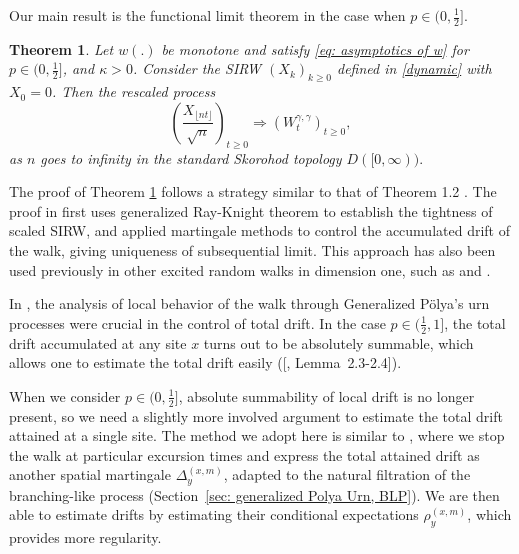 \documentclass[twoside,12pt,a4paper]{article}
\newtheorem{theorem}{Theorem}[section]
\numberwithin{equation}{section}
\begin{document}
	Our main result is the functional limit theorem in the case when $p\in (0,\frac{1}{2}]$.
	\begin{theorem}\label{thm: main}
		Let $w(.)$ be monotone and satisfy \eqref{eq: asymptotics of w} for $p\in (0,\frac{1}{2}]$, and $\kappa >0 $. Consider the SIRW $(X_k)_{k\geq 0}$ defined in \eqref{dynamic} with $X_0 =0$. Then the rescaled process
		$$
		\left(  \frac{X_{\lfloor nt \rfloor }}{\sqrt{n}}  \right)_{t\geq 0} \Longrightarrow \left( W^{\gamma,\gamma}_{t}\right)_{t\geq 0},
		$$ as $n$ goes to infinity in the standard Skorohod topology $D([0,\infty) ).$
	\end{theorem}
	The proof of Theorem \ref{thm: main} follows a strategy similar to that of Theorem 1.2 \cite{KMP22}. The proof in \cite{KMP22} first uses generalized Ray-Knight theorem to establish the tightness of scaled SIRW, and applied martingale methods to control the accumulated drift of the walk, giving uniqueness of subsequential limit. 
	This approach
	has also been used previously in other excited random walks in dimension one, such as \cite{DK12} and \cite{KP16}.

	In \cite{KMP22}, the analysis of local behavior of the walk through Generalized P\"olya's urn processes were crucial in the control of total drift. 
	In the case $p \in (\frac{1}{2}, 1]$, the total drift accumulated at any site $x$ turns out to be absolutely summable, which allows one to estimate the total drift easily ([\cite{KMP22}, Lemma~2.3-2.4]).

	When we consider $p \in (0,\frac{1}{2}]$, absolute summability of local drift is no longer present, so we need a slightly more involved argument to estimate the total drift attained at a single site. The method we adopt here is similar to \cite{KP16}, where we stop the walk at particular excursion times and express the total attained drift as another spatial martingale $\Delta_y^{(x,m)}$, adapted to the natural filtration of the branching-like process (Section~\ref{sec: generalized Polya Urn, BLP}). We are then able to estimate drifts by estimating their conditional expectations $\rho_y^{(x,m)}$, which provides more regularity.
\end{document}
